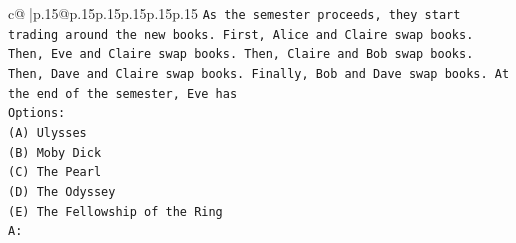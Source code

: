 \documentclass{article}
\begin{document}
{\begin{supertabular}{c@{$\;$}|p{.15\linewidth}@{}p{.15\linewidth}p{.15\linewidth}p{.15\linewidth}p{.15\linewidth}p{.15\linewidth}}
{{{\texttt{As the semester proceeds, they start trading around the new books. First, Alice and Claire swap books. Then, Eve and Claire swap books. Then, Claire and Bob swap books. Then, Dave and Claire swap books. Finally, Bob and Dave swap books. At the end of the semester, Eve has} \\
\texttt{Options:} \\
\texttt{(A) Ulysses} \\
\texttt{(B) Moby Dick} \\
\texttt{(C) The Pearl} \\
\texttt{(D) The Odyssey} \\
\texttt{(E) The Fellowship of the Ring} \\
\texttt{A:} \\
            }
        }
    }
     \\ \\


\end{supertabular}}
\end{document}
